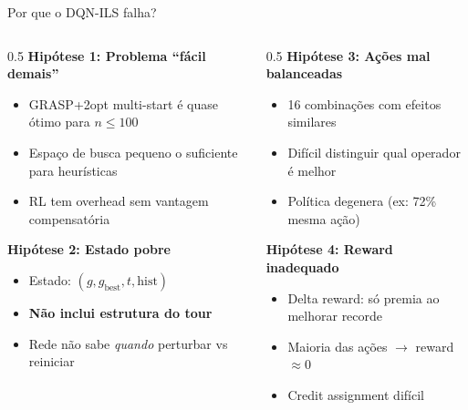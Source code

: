 \documentclass[11pt, xcolor=dvipsnames]{beamer}
\begin{document}
\begin{frame}{Por que o DQN-ILS falha?}
  \footnotesize
  \begin{columns}[T]
    \begin{column}{0.5\textwidth}
      \textbf{Hipótese 1: Problema ``fácil demais''}
      \begin{itemize}
        \item GRASP+2opt multi-start é quase ótimo para $n \leq 100$
        \item Espaço de busca pequeno o suficiente para heurísticas
        \item RL tem overhead sem vantagem compensatória
      \end{itemize}

      \vspace{3mm}
      \textbf{Hipótese 2: Estado pobre}
      \begin{itemize}
        \item Estado: $(g, g_{\text{best}}, t, \text{hist})$
        \item \textbf{Não inclui estrutura do tour}
        \item Rede não sabe \emph{quando} perturbar vs reiniciar
      \end{itemize}
    \end{column}
    \begin{column}{0.5\textwidth}
      \textbf{Hipótese 3: Ações mal balanceadas}
      \begin{itemize}
        \item 16 combinações com efeitos similares
        \item Difícil distinguir qual operador é melhor
        \item Política degenera (ex: 72\% mesma ação)
      \end{itemize}

      \vspace{3mm}
      \textbf{Hipótese 4: Reward inadequado}
      \begin{itemize}
        \item Delta reward: só premia ao melhorar recorde
        \item Maioria das ações $\rightarrow$ reward $\approx 0$
        \item Credit assignment difícil
      \end{itemize}
    \end{column}
  \end{columns}
\end{frame}
\end{document}
